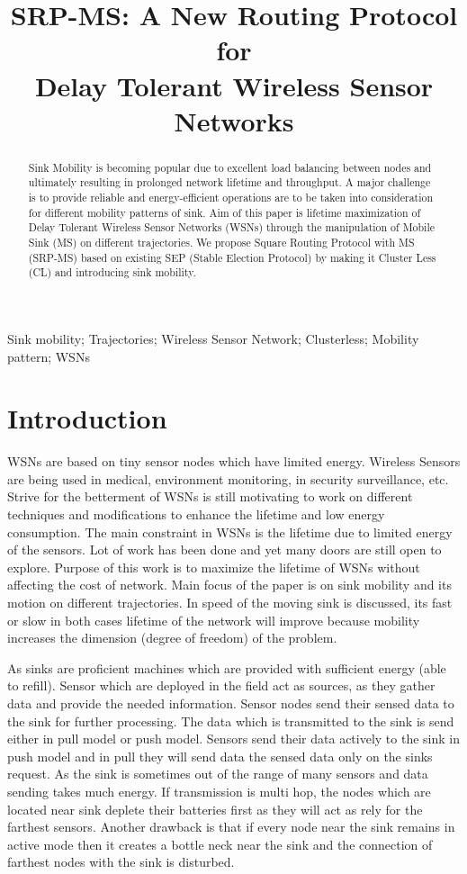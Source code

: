 \documentclass{article}
\title{SRP-MS: A New Routing Protocol for\\ Delay Tolerant Wireless Sensor Networks}
\begin{document}
\maketitle
\begin{abstract}
Sink Mobility is becoming popular due to excellent load balancing between nodes and ultimately resulting in prolonged network lifetime and throughput. A major challenge is to provide reliable and energy-efficient operations are to be taken into consideration for different mobility patterns of sink. Aim of this paper is lifetime maximization of Delay Tolerant Wireless Sensor Networks (WSNs) through the manipulation of Mobile Sink (MS) on different trajectories. We propose Square Routing Protocol with MS (SRP-MS) based on existing SEP (Stable Election Protocol) by making it Cluster Less (CL) and introducing sink mobility.
\end{abstract}
\begin{keywords}
Sink mobility; Trajectories; Wireless Sensor Network; Clusterless; Mobility pattern; WSNs
\end{keywords}
\section{Introduction}
\label{sec:intro}

WSNs are based on tiny sensor nodes which have limited energy. Wireless Sensors are being used in medical, environment monitoring, in security surveillance, etc. Strive for the betterment of WSNs is still motivating to work on different techniques and modifications to enhance the lifetime and low energy consumption.  The main constraint in WSNs is the lifetime due to limited energy of the sensors. Lot of work has been done and yet many doors are still open to explore. Purpose of this work is to maximize the lifetime of WSNs without affecting the cost of network. Main focus of the paper is on sink mobility and its motion on different trajectories. In \cite{1} speed of the moving sink is discussed, its fast or slow in both cases lifetime of the network will improve because mobility increases the dimension (degree of freedom) of the problem.

As sinks are proficient machines which are provided with sufficient energy (able to refill). Sensor which are deployed in the field act as sources, as they gather data and provide the needed information. Sensor nodes send their sensed data to the sink for further processing. The data which is transmitted to the sink is send either in pull model or push model. Sensors send their data actively to the sink in push model and in pull they will send data the sensed data only on the sinks request. As the sink is sometimes out of the range of many sensors and data sending takes much energy. If transmission is multi hop, the nodes which are located near sink deplete their batteries first as they will act as rely for the farthest sensors. Another drawback is that if every node near the sink remains in active mode then it creates a bottle neck near the sink and the connection of farthest nodes with the sink is disturbed.
\end{document}
